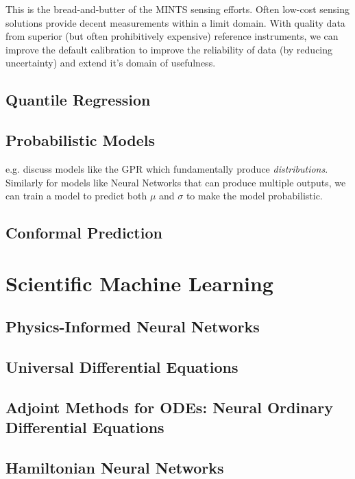 This is the bread-and-butter of the MINTS sensing efforts. Often low-cost sensing solutions provide decent measurements within a limit domain. With quality data from superior (but often prohibitively expensive) reference instruments, we can improve the default calibration to improve the reliability of data (by reducing uncertainty) and extend it's domain of usefulness.

\subsection{Quantile Regression}
\subsection{Probabilistic Models}
e.g. discuss models like the GPR which fundamentally produce \textit{distributions}. Similarly for models like Neural Networks that can produce multiple outputs, we can train a model to predict both $\mu$ and $\sigma$ to make the model probabilistic.

\subsection{Conformal Prediction}




\section{Scientific Machine Learning}
\subsection{Physics-Informed Neural Networks}
\subsection{Universal Differential Equations}
\subsection{Adjoint Methods for ODEs: Neural Ordinary Differential Equations}
\subsection{Hamiltonian Neural Networks}



